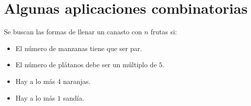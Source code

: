 \section{Algunas aplicaciones combinatorias}
\label{sec:combinatorial-applications}

  Se buscan las formas de llenar un canasto con \(n\) frutas si:
  \begin{itemize}
  \item El número de manzanas tiene que ser par.
  \item El número de plátanos debe ser un múltiplo de \(5\).
  \item Hay a lo más \(4\) naranjas.
  \item Hay a lo más \(1\) sandía.
  \end{itemize}

